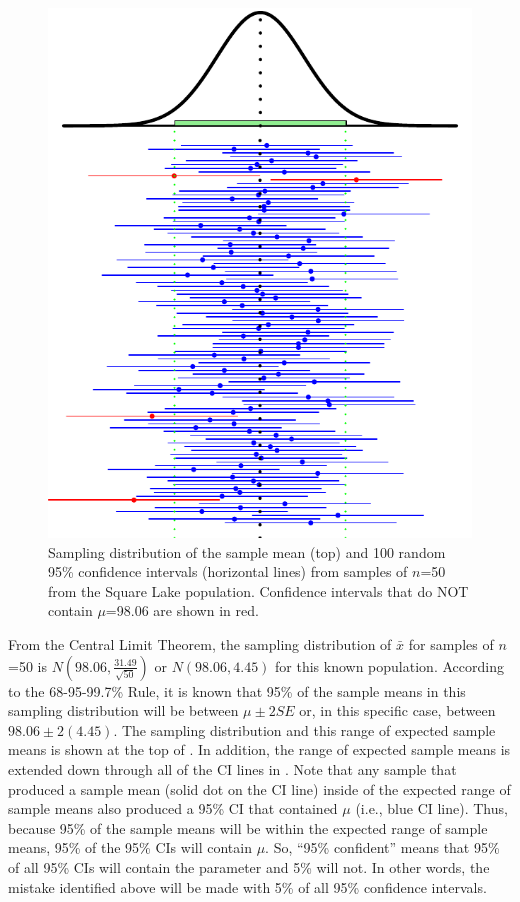 \documentclass[10pt,openany]{book}\usepackage[]{graphicx}\usepackage[]{color}
\newenvironment{knitrout}{}{} %
\begin{document}
\begin{knitrout}
\color{fgcolor}\begin{figure}[hbtp]

{\centering \includegraphics[width=.6\linewidth]{Figs/CIex100-1} 

}

\caption[Sampling distribution of the sample mean (top) and 100 random 95\% confidence intervals (horizontal lines) from samples of $n$=50 from the Square Lake population]{Sampling distribution of the sample mean (top) and 100 random 95\% confidence intervals (horizontal lines) from samples of $n$=50 from the Square Lake population.  Confidence intervals that do NOT contain $\mu$=98.06 are shown in red.}\label{fig:CIex100}
\end{figure}


\end{knitrout}

\vspace{12pt}  %

From the Central Limit Theorem, the sampling distribution of $\bar{x}$ for samples of $n$=50 is $N(98.06,\frac{31.49}{\sqrt{50}})$ or $N(98.06,4.45)$ for this known population.  According to the 68-95-99.7\% Rule, it is known that 95\% of the sample means in this sampling distribution will be between $\mu\pm2SE$ or, in this specific case, between $98.06\pm2(4.45)$.  The sampling distribution and this range of expected sample means is shown at the top of .  In addition, the range of expected sample means is extended down through all of the CI lines in .  Note that any sample that produced a sample mean (solid dot on the CI line) inside of the expected range of sample means also produced a 95\% CI that contained $\mu$ (i.e., blue CI line).  Thus, because 95\% of the sample means will be within the expected range of sample means, 95\% of the 95\% CIs will contain $\mu$.  So, ``95\% confident'' means that 95\% of all 95\% CIs will contain the parameter and 5\% will not.  In other words, the mistake identified above will be made with 5\% of all 95\% confidence intervals.
\end{document}
